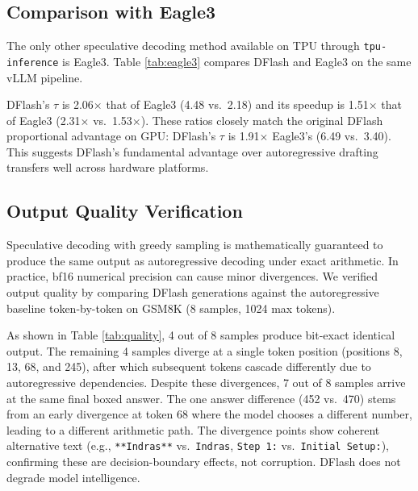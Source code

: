 \documentclass[12pt,letterpaper]{article}
\begin{document}
\subsection{Comparison with Eagle3}

The only other speculative decoding method available on TPU through \texttt{tpu-inference} is Eagle3. Table \ref{tab:eagle3} compares DFlash and Eagle3 on the same vLLM pipeline.

\begin{table}[htbp]
\caption{DFlash vs.\ Eagle3 on the vLLM TPU pipeline. Different target models (Qwen3-4B vs.\ Llama-3.1-8B), so not a direct head-to-head, but shows the advantage of block diffusion (15 tokens/step) over autoregressive drafting (3 tokens/step).}
\label{tab:eagle3}
\resizebox{0.85\linewidth}{!}{}
\end{table}

DFlash's $\tau$ is 2.06$\times$ that of Eagle3 (4.48 vs.\ 2.18) and its speedup is 1.51$\times$ that of Eagle3 (2.31$\times$ vs.\ 1.53$\times$). These ratios closely match the original DFlash proportional advantage on GPU: DFlash's $\tau$ is 1.91$\times$ Eagle3's (6.49 vs.\ 3.40). This suggests DFlash's fundamental advantage over autoregressive drafting transfers well across hardware platforms.

\subsection{Output Quality Verification}

Speculative decoding with greedy sampling is mathematically guaranteed to produce the same output as autoregressive decoding under exact arithmetic. In practice, bf16 numerical precision can cause minor divergences. We verified output quality by comparing DFlash generations against the autoregressive baseline token-by-token on GSM8K (8 samples, 1024 max tokens).

\begin{table}[htbp]
\caption{Output quality check on GSM8K. 4/8 samples produce bit-exact identical output; 7/8 arrive at the same final $\backslash$\texttt{boxed\{\}} math answer. Divergences occur at random positions where top-2 logits are close, consistent with bf16 precision effects.}
\label{tab:quality}
\resizebox{\linewidth}{!}{}
\end{table}

As shown in Table \ref{tab:quality}, 4 out of 8 samples produce bit-exact identical output. The remaining 4 samples diverge at a single token position (positions 8, 13, 68, and 245), after which subsequent tokens cascade differently due to autoregressive dependencies. Despite these divergences, 7 out of 8 samples arrive at the same final boxed answer. The one answer difference (452 vs.\ 470) stems from an early divergence at token 68 where the model chooses a different number, leading to a different arithmetic path. The divergence points show coherent alternative text (e.g., \texttt{**Indras**} vs.\ \texttt{Indras}, \texttt{Step 1:} vs.\ \texttt{Initial Setup:}), confirming these are decision-boundary effects, not corruption. DFlash does not degrade model intelligence.
\end{document}
